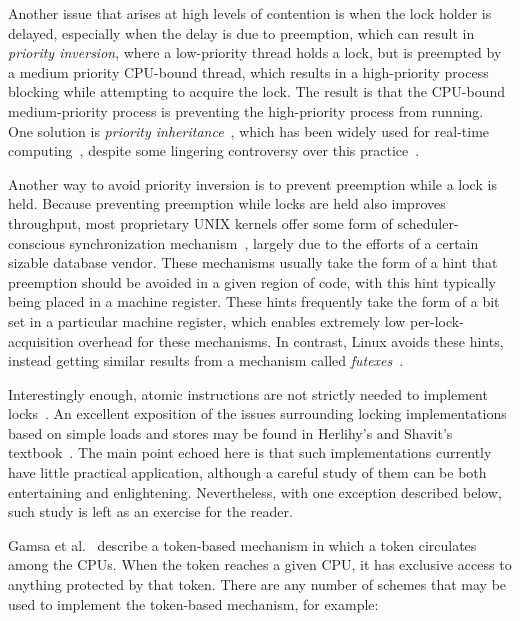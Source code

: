 Another issue that arises at high levels of contention is when the
lock holder is delayed, especially when the delay is due to
preemption, which can result in \emph{priority inversion},
where a low-priority thread holds a lock, but is preempted
by a medium priority CPU-bound thread, which results in
a high-priority process blocking while attempting to acquire the
lock.
The result is that the CPU-bound medium-priority process is preventing the
high-priority process from running.
One solution is \emph{priority inheritance}~\cite{Lampson1980Mesa},
which has been widely used for real-time
computing~\cite{LuiSha1990PriorityInheritance,JonathanCorbet2006PriorityInheritance},
despite some lingering controversy over this
practice~\cite{Yodaiken2004FSM,DougLocke2002a}.

Another way to avoid priority inversion is to prevent preemption
while a lock is held.
Because preventing preemption while locks are held also improves throughput,
most proprietary UNIX kernels offer some form of scheduler-conscious
synchronization mechanism~\cite{Kontothanassis97a},
largely due to the efforts of a certain sizable database vendor.
These mechanisms usually take the form of a hint that preemption
should be avoided in a given region of code, with this hint typically
being placed in a machine register.
These hints frequently take the form of a bit set in a particular
machine register, which enables extremely low per-lock-acquisition overhead
for these mechanisms.
In contrast, Linux avoids these hints, instead getting
similar results from a mechanism called
\emph{futexes}~\cite{HubertusFrancke2002Futex,IngoMolnar2006RobustFutexes,StevenRostedt2006piFutexes,UlrichDrepper2011Futexes}.

Interestingly enough, atomic instructions are not strictly needed to
implement locks~\cite{Dijkstra65a,Lamport74a}.
An excellent exposition of the issues surrounding locking implementations
based on simple loads and stores may be found in Herlihy's and
Shavit's textbook~\cite{HerlihyShavit2008Textbook,HerlihyShavit2020Textbook}.
The main point echoed here is that such implementations currently
have little practical application, although a careful study of
them can be both entertaining and enlightening.
Nevertheless, with one exception described below, such study is left
as an exercise for the reader.

Gamsa et al.~\cite[Section 5.3]{Gamsa99} describe a token-based
mechanism in which a token circulates among the CPUs.
When the token reaches a given CPU, it has exclusive
access to anything protected by that token.
There are any number of schemes that may be used to implement
the token-based mechanism, for example:


